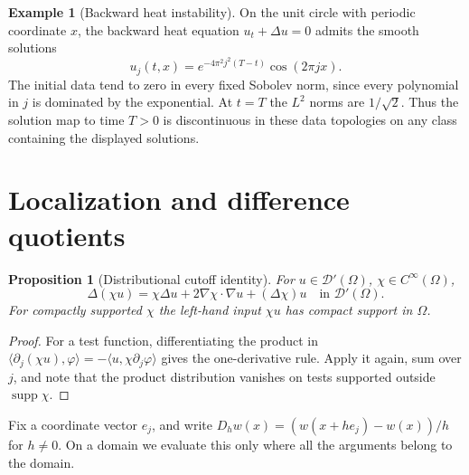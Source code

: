 \documentclass[11pt,oneside,openany]{book}
\DeclareMathOperator{\supp}{supp}
\theoremstyle{plain}
\newtheorem{proposition}[theorem]{Proposition}
\theoremstyle{definition}
\newtheorem{example}[theorem]{Example}
\theoremstyle{remark}
\begin{document}
\begin{example}[Backward heat instability]
On the unit circle with periodic coordinate \(x\), the backward
heat equation \(u_t+\Delta u=0\) admits the smooth solutions
\[
 u_j(t,x)=e^{-4\pi^2j^2(T-t)}\cos(2\pi jx).
\]
The initial data tend to zero in every fixed Sobolev norm,
since every polynomial in \(j\) is dominated by the exponential.
At \(t=T\) the \(L^2\) norms are \(1/\sqrt2\). Thus the solution
map to time \(T>0\) is discontinuous in these data topologies
on any class containing the displayed solutions.
\end{example}

\section{Localization and difference quotients}
\label{pde:C04}

\begin{proposition}[Distributional cutoff identity]
\label{prop:pde-cutoff}
For \(u\in\mathcal D'(\Omega)\), \(\chi\in C^\infty(\Omega)\),
\[
 \Delta(\chi u)=\chi\Delta u+2\nabla\chi\cdot\nabla u+(\Delta\chi)u
 \quad\text{in }\mathcal D'(\Omega).
\]
For compactly supported \(\chi\) the left-hand input \(\chi u\)
has compact support in \(\Omega\).
\end{proposition}
\begin{proof}
For a test function, differentiating the product in
\(\langle\partial_j(\chi u),\varphi\rangle
=-\langle u,\chi\partial_j\varphi\rangle\)
gives the one-derivative rule. Apply it again, sum over \(j\),
and note that the product distribution vanishes on tests supported
outside \(\supp\chi\).
\end{proof}

Fix a coordinate vector \(e_j\), and write
\(D_h w(x)=(w(x+h e_j)-w(x))/h\) for \(h\ne0\).
On a domain we evaluate this only where all the arguments belong
to the domain.
\end{document}
